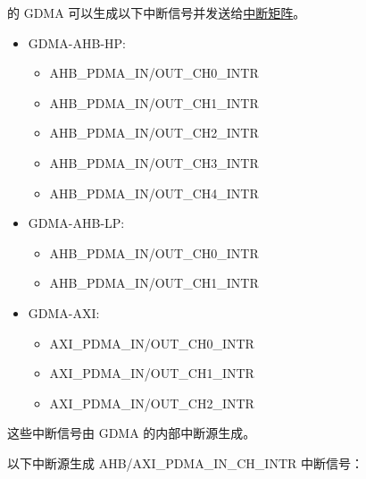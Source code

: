 \documentclass[main\_\_CN.tex]{subfiles}
\begin{document}
\chipname{} 的 GDMA 可以生成以下中断信号并发送给\hyperref[mod:intmtrx]{中断矩阵}。
    \begin{itemize}
        \item GDMA-AHB-HP:
            \begin{itemize}
                \item AHB\_PDMA\_IN/OUT\_CH0\_INTR
                \item AHB\_PDMA\_IN/OUT\_CH1\_INTR
                \item AHB\_PDMA\_IN/OUT\_CH2\_INTR
                \item AHB\_PDMA\_IN/OUT\_CH3\_INTR
                \item AHB\_PDMA\_IN/OUT\_CH4\_INTR
            \end{itemize}
        \item GDMA-AHB-LP:
            \begin{itemize}
                \item AHB\_PDMA\_IN/OUT\_CH0\_INTR
                \item AHB\_PDMA\_IN/OUT\_CH1\_INTR
            \end{itemize}
        \item GDMA-AXI:
            \begin{itemize}
                \item AXI\_PDMA\_IN/OUT\_CH0\_INTR
                \item AXI\_PDMA\_IN/OUT\_CH1\_INTR
                \item AXI\_PDMA\_IN/OUT\_CH2\_INTR
            \end{itemize}
    \end{itemize}

这些中断信号由 GDMA 的内部中断源生成。

以下中断源生成 AHB/AXI\_PDMA\_IN\_CH\_INTR 中断信号：
\end{document}
